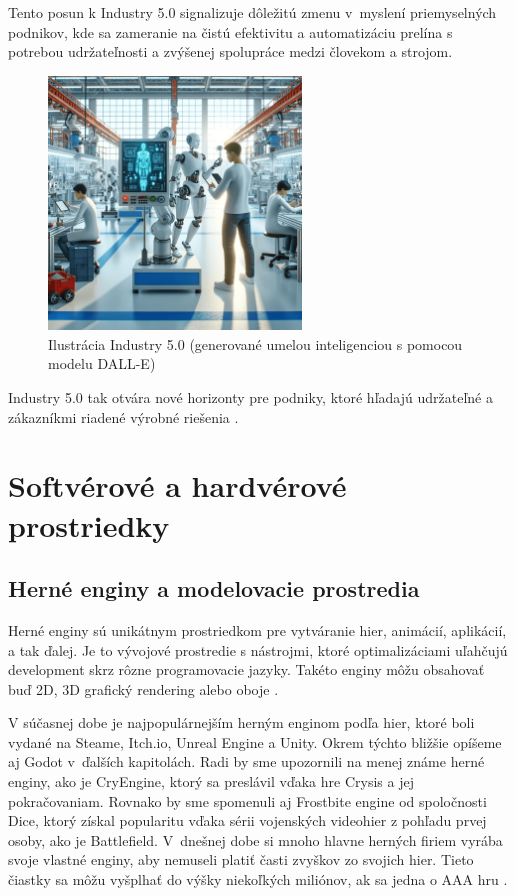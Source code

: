 Tento posun k Industry 5.0 signalizuje dôležitú zmenu v~myslení priemyselných podnikov, kde sa zameranie na čistú efektivitu a automatizáciu prelína s potrebou udržateľnosti a zvýšenej spolupráce medzi človekom a strojom.

\begin{figure}[h]
\centering
\includegraphics[width=0.6\textwidth]{img/industry_5.0.png}
\caption{Ilustrácia Industry 5.0 (generované umelou inteligenciou s pomocou modelu DALL-E) \cite{kucera2024industry40}}
\label{fig:industry_5.0}
\end{figure}

Industry 5.0 tak otvára nové horizonty pre podniky, ktoré hľadajú udržateľné a zákazníkmi riadené výrobné riešenia \cite{kucera2024industry40}. 

\section{Softvérové a hardvérové prostriedky}

\subsection{Herné enginy a modelovacie prostredia}

Herné enginy sú unikátnym prostriedkom pre vytváranie hier, animácií, aplikácií, a tak ďalej. Je to vývojové prostredie s nástrojmi, ktoré optimalizáciami uľahčujú development skrz rôzne programovacie jazyky. Takéto enginy môžu obsahovať buď 2D, 3D grafický rendering alebo oboje \cite{arm_gaming_engines}.

V súčasnej dobe je najpopulárnejším herným enginom podľa hier, ktoré boli vydané na Steame, Itch.io, Unreal Engine a Unity. Okrem týchto bližšie opíšeme aj Godot v~ďalších kapitolách. Radi by sme upozornili na menej známe herné enginy, ako je CryEngine, ktorý sa preslávil vďaka hre Crysis a jej pokračovaniam. Rovnako by sme spomenuli aj Frostbite engine od spoločnosti Dice, ktorý získal popularitu vďaka sérii vojenských videohier z pohľadu prvej osoby, ako je Battlefield. V~dnešnej dobe si mnoho hlavne herných firiem vyrába svoje vlastné enginy, aby nemuseli platiť časti zvyškov zo svojich hier. Tieto čiastky sa môžu vyšplhať do výšky niekoľkých miliónov, ak sa jedna o AAA hru \cite{perforce2023gameengines}.  %

